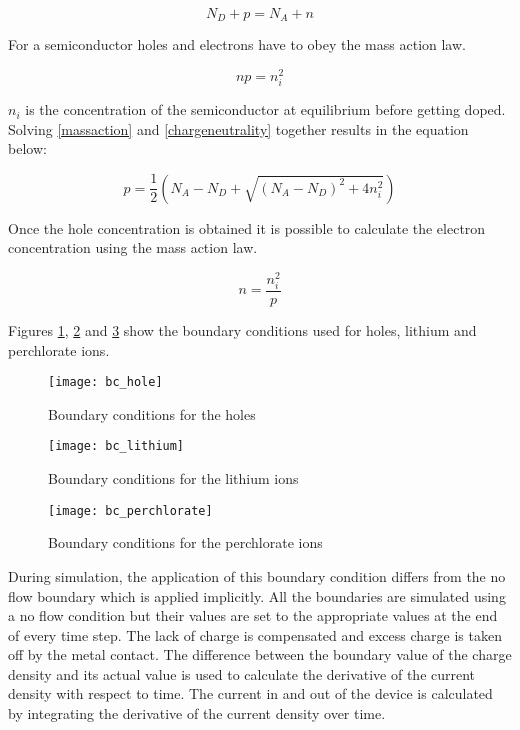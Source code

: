 \begin{doublespace}
\begin{equation}
N_{D} + p=N_{A} + n
\label{chargeneutrality}
\end{equation}

For a semiconductor holes and electrons have to obey the mass action law.

\begin{equation}
np=n_i^2
\label{massaction}
\end{equation}

$n_i$ is the concentration of the semiconductor at equilibrium before getting doped. Solving \eqref{massaction} and \eqref{chargeneutrality} together results in the equation below:

\begin{equation}
p=\frac{1}{2}(N_A - N_D + \sqrt{(N_A - N_D)^2+4n_i^2})
\label{nbound}
\end{equation}

Once the hole concentration is obtained it is possible to calculate the electron concentration using the mass action law.

\begin{equation}
n=\frac{n_i^2}{p}
\label{pbound}
\end{equation}

Figures \ref{bc_hole}, \ref{bc_lithium} and \ref{bc_perchlorate} show the boundary conditions used for holes, lithium and perchlorate ions.

\begin{figure}[!htp]
\centering
\texttt{[image: bc\_hole]}
\caption{Boundary conditions for the holes } 
\label{bc_hole}
\end{figure}

\begin{figure}[!htp]
\centering
\texttt{[image: bc\_lithium]}
\caption{Boundary conditions for the lithium ions } 
\label{bc_lithium}
\end{figure}

\begin{figure}[!htp]
\centering
\texttt{[image: bc\_perchlorate]}
\caption{Boundary conditions for the perchlorate ions } 
\label{bc_perchlorate}
\end{figure}

During simulation, the application of this boundary condition differs from the no flow boundary which is applied implicitly. All the boundaries are simulated using a no flow condition but their values are set to the appropriate values at the end of every time step. The lack of charge is compensated and excess charge is taken off by the metal contact. The difference between the boundary value of the charge density and its actual value is used to calculate the derivative of the current density with respect to time. The current in and out of the device is calculated by integrating the derivative of the current density over time. 


\end{doublespace}
